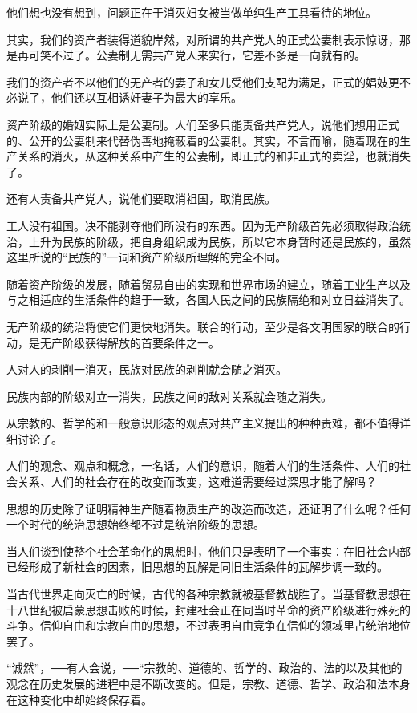 \documentclass[UTF8]{ctexart}
\begin{document}
他们想也没有想到，问题正在于消灭妇女被当做单纯生产工具看待的地位。

其实，我们的资产者装得道貌岸然，对所谓的共产党人的正式公妻制表示惊讶，那是再可笑不过了。公妻制无需共产党人来实行，它差不多是一向就有的。

我们的资产者不以他们的无产者的妻子和女儿受他们支配为满足，正式的娼妓更不必说了，他们还以互相诱奸妻子为最大的享乐。

资产阶级的婚姻实际上是公妻制。人们至多只能责备共产党人，说他们想用正式的、公开的公妻制来代替伪善地掩蔽着的公妻制。其实，不言而喻，随着现在的生产关系的消灭，从这种关系中产生的公妻制，即正式的和非正式的卖淫，也就消失了。

还有人责备共产党人，说他们要取消祖国，取消民族。

工人没有祖国。决不能剥夺他们所没有的东西。因为无产阶级首先必须取得政治统治，上升为民族的阶级，把自身组织成为民族，所以它本身暂时还是民族的，虽然这里所说的“民族的”一词和资产阶级所理解的完全不同。

随着资产阶级的发展，随着贸易自由的实现和世界市场的建立，随着工业生产以及与之相适应的生活条件的趋于一致，各国人民之间的民族隔绝和对立日益消失了。

无产阶级的统治将使它们更快地消失。联合的行动，至少是各文明国家的联合的行动，是无产阶级获得解放的首要条件之一。

人对人的剥削一消灭，民族对民族的剥削就会随之消灭。

民族内部的阶级对立一消失，民族之间的敌对关系就会随之消失。

从宗教的、哲学的和一般意识形态的观点对共产主义提出的种种责难，都不值得详细讨论了。

人们的观念、观点和概念，一名话，人们的意识，随着人们的生活条件、人们的社会关系、人们的社会存在的改变而改变，这难道需要经过深思才能了解吗？

思想的历史除了证明精神生产随着物质生产的改造而改造，还证明了什么呢？任何一个时代的统治思想始终都不过是统治阶级的思想。

当人们谈到使整个社会革命化的思想时，他们只是表明了一个事实：在旧社会内部已经形成了新社会的因素，旧思想的瓦解是同旧生活条件的瓦解步调一致的。

当古代世界走向灭亡的时候，古代的各种宗教就被基督教战胜了。当基督教思想在十八世纪被启蒙思想击败的时候，封建社会正在同当时革命的资产阶级进行殊死的斗争。信仰自由和宗教自由的思想，不过表明自由竞争在信仰的领域里占统治地位罢了。

“诚然”，──有人会说，──“宗教的、道德的、哲学的、政治的、法的以及其他的观念在历史发展的进程中是不断改变的。但是，宗教、道德、哲学、政治和法本身在这种变化中却始终保存着。
\end{document}
